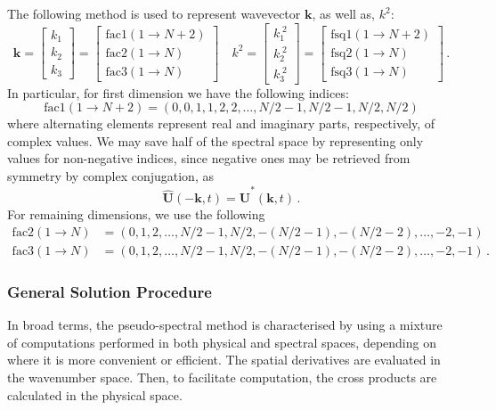 \documentclass{pracamgren}
\begin{document}
The following method is used to represent wavevector $\mathbf{k}$, as well as, $k^2$:
$$
\mathbf{k} =
\begin{bmatrix}
k_1 \\ k_2 \\ k_3
\end{bmatrix}
=
\begin{bmatrix}
\text{fac1}(1 \rightarrow N + 2) \\ \text{fac2}(1 \rightarrow N) \\ \text{fac3}(1 \rightarrow N)
\end{bmatrix}
\quad
k^2 =
\begin{bmatrix}
k_1^{\; 2} \\ k_2^{\; 2} \\ k_3^{\; 2}
\end{bmatrix}
=
\begin{bmatrix}
\text{fsq1}(1 \rightarrow N + 2) \\ \text{fsq2}(1 \rightarrow N) \\ \text{fsq3}(1 \rightarrow N)
\end{bmatrix}
\, .
$$
In particular, for first dimension we have the following indices:
$$ \text{fac1}(1 \rightarrow N + 2) = (0, 0, 1, 1, 2, 2, \ldots, N/2 - 1, N/2 - 1, N/2, N/2)  $$
where alternating elements represent real and imaginary parts, respectively, of complex values.
We may save half of the spectral space by representing only values for non-negative indices, since negative ones may be retrieved from symmetry by complex conjugation, as
$$ \mathbf{\hat{U}}(- \mathbf{k}, t) = \mathbf{\hat{U}}^* (\mathbf{k}, t) \, . $$
For remaining dimensions, we use the following
\begin{align*}
\text{fac2}(1 \rightarrow N) &= (0, 1, 2, \ldots, N/2 - 1, N/2, -(N/2 -1), -(N/2 -2), \ldots, -2, -1) \\
\text{fac3}(1 \rightarrow N) &= (0, 1, 2, \ldots, N/2 - 1, N/2, -(N/2 -1), -(N/2 -2), \ldots, -2, -1) \, .
\end{align*}

\subsubsection{General Solution Procedure}

In broad terms, the pseudo-spectral method is characterised by using a mixture of computations performed in both physical and spectral spaces, depending on where it is more convenient or efficient. 
The spatial derivatives are evaluated in the wavenumber space.
Then, to facilitate computation, the cross products are calculated in the physical space.
\end{document}
